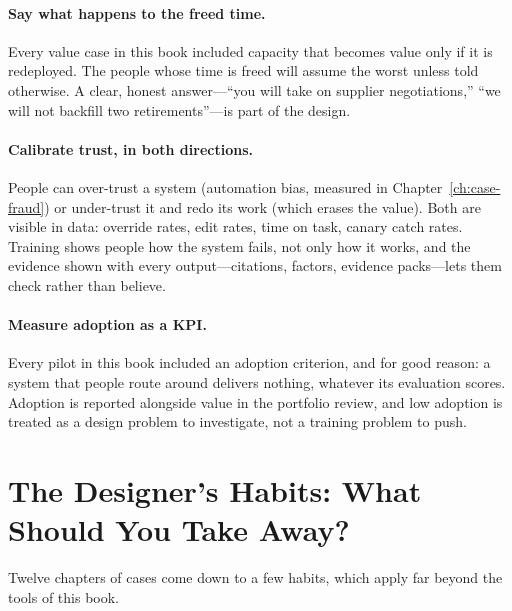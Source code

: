 \paragraph{Say what happens to the freed time.} Every value case in this book included capacity that becomes value only if it is redeployed. The people whose time is freed will assume the worst unless told otherwise. A clear, honest answer---``you will take on supplier negotiations,'' ``we will not backfill two retirements''---is part of the design.

\paragraph{Calibrate trust, in both directions.} People can over-trust a system (automation bias, measured in Chapter~\ref{ch:case-fraud}) or under-trust it and redo its work (which erases the value). Both are visible in data: override rates, edit rates, time on task, canary catch rates. Training shows people how the system fails, not only how it works, and the evidence shown with every output---citations, factors, evidence packs---lets them check rather than believe.

\paragraph{Measure adoption as a KPI.} Every pilot in this book included an adoption criterion, and for good reason: a system that people route around delivers nothing, whatever its evaluation scores. Adoption is reported alongside value in the portfolio review, and low adoption is treated as a design problem to investigate, not a training problem to push.

\section{The Designer's Habits: What Should You Take Away?}
\label{sec:cap-habits}

Twelve chapters of cases come down to a few habits, which apply far beyond the tools of this book.

